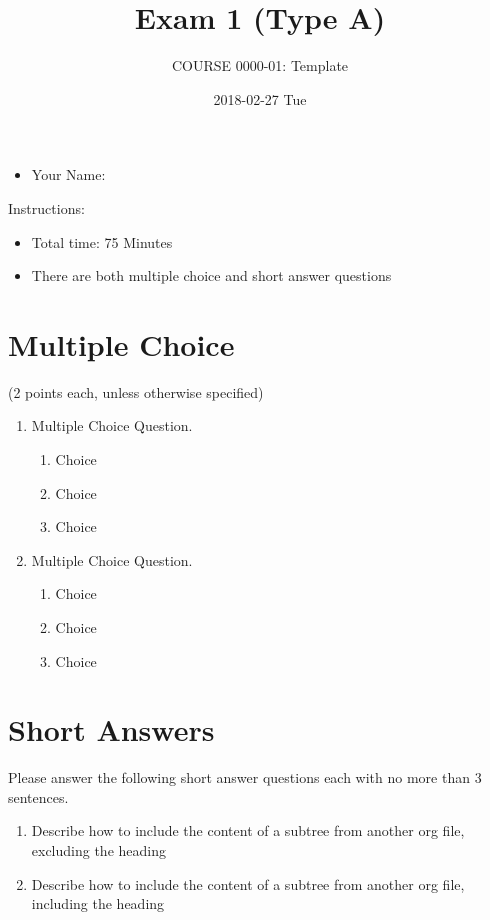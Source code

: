 \documentclass[article,letterpaper,times,10pt,listings-bw,microtype]{article}
\author{COURSE 0000-01: Template}
\date{2018-02-27 Tue}
\title{Exam 1 (Type A)}
\begin{document}
\maketitle
\vspace{20 mm}

\begin{itemize}
\item Your Name: \underline{\hspace{4cm}}
\end{itemize}

\vspace{20 mm}

Instructions:

\begin{itemize}
\item Total time: 75 Minutes
\item There are both multiple choice and short answer questions
\end{itemize}
\clearpage
\section*{Multiple Choice}
\label{sec:org7d6dbda}
(2 points each, unless otherwise specified)
\begin{enumerate}
\item Multiple Choice Question.
\begin{enumerate}
\item Choice
\item Choice
\item Choice
\end{enumerate}

\item Multiple Choice Question.
\begin{enumerate}
\item Choice
\item Choice
\item Choice
\end{enumerate}
\end{enumerate}
\clearpage
\section*{Short Answers}
\label{sec:org1755fad}
\begin{mdframed}[style=exampledefault, frametitle={}]
Please answer the following short answer questions each with no more than 3
sentences.
\end{mdframed}

\begin{enumerate}
\item Describe how to include the content of a subtree from another org file, excluding the heading

\vspace{50 mm}

\item Describe how to include the content of a subtree from another org file, including the heading
\end{enumerate}
\end{document}
